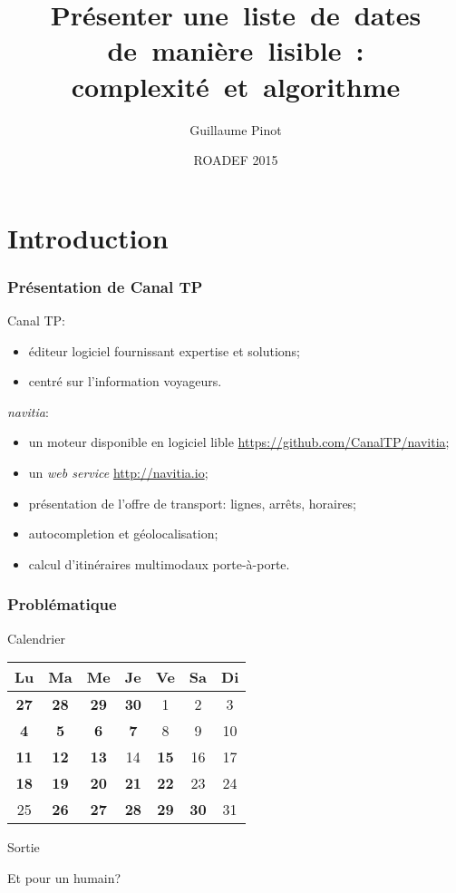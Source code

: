 \documentclass[table]{beamer}
\title[Présenter une~liste~de~dates de~manière~lisible]
{Présenter une~liste~de~dates de~manière~lisible~:
  complexité~et~algorithme}
\author{Guillaume Pinot}
\institute[Canal TP] %
{
  Canal TP\\
  20 rue Hector Malot\\
  75012 Paris, France\\
  \texttt{guillaume.pinot@canaltp.fr}}
\date{ROADEF 2015}
\newcommand{\+}{\cellcolor[gray]{1}\bfseries}
\newcommand*{\foreign}[2][english]{%
    \emph{\foreignlanguage{#1}{#2}}%
}
\begin{document}
\begin{frame}
  \titlepage    
\end{frame}

\section*{Introduction}

\begin{frame}
  \frametitle{Présentation de Canal TP}

  Canal TP:
  \begin{itemize}
  \item éditeur logiciel fournissant expertise et solutions;
  \item centré sur l'information voyageurs.
  \end{itemize}

  \emph{navitia}:
  \begin{itemize}
  \item un moteur disponible en logiciel lible
    \url{https://github.com/CanalTP/navitia};
  \item un \foreign{web service} \url{http://navitia.io};
  \item présentation de l'offre de transport: lignes, arrêts, horaires;
  \item autocompletion et géolocalisation;
  \item calcul d'itinéraires multimodaux porte-à-porte.
  \end{itemize}
\end{frame}

\begin{frame}
  \frametitle{Problématique}

  \begin{block}{Calendrier}
    \centering
    \begin{tabular}{|ccccccc|}
      \hline
      Lu  & Ma & Me & Je & Ve & Sa & Di\\
      \hline
      \+27&\+28&\+29&\+30&  1 &  2 &  3\\
      \+4 & \+5& \+6& \+7&  8 &  9 & 10\\
      \+11&\+12&\+13& 14 &\+15& 16 & 17\\
      \+18&\+19&\+20&\+21&\+22& 23 & 24\\
      25  &\+26&\+27&\+28&\+29&\+30& 31\\
      \hline
    \end{tabular}
  \end{block}

  \begin{block}{Sortie}
  \end{block}

  Et pour un humain?
\end{frame}
\end{document}
